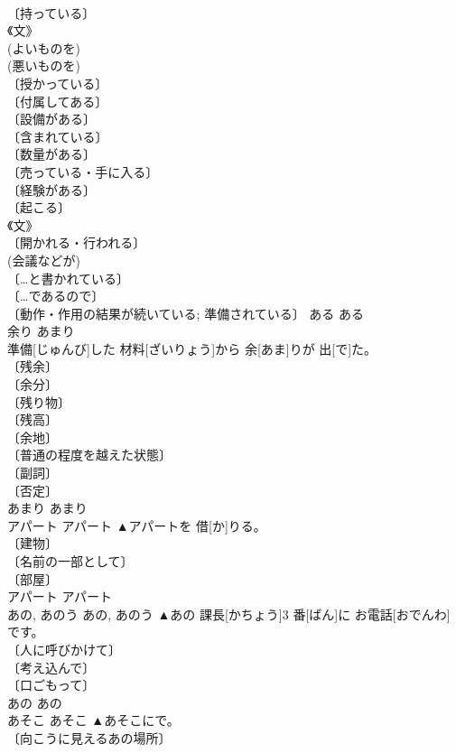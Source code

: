 \documentclass[8pt]{extreport}
\begin{document}
\begin{CJK}{UTF8}{min}
\\	〔持っている〕 
\\	《文》 
\\	(よいものを) 
\\	(悪いものを) 
\\	〔授かっている〕 
\\	〔付属してある〕 
\\	〔設備がある〕 
\\	〔含まれている〕 
\\	〔数量がある〕 
\\	〔売っている・手に入る〕 
\\	〔経験がある〕 
\\	〔起こる〕 
\\	《文》 
\\	〔開かれる・行われる〕 
\\	(会議などが) 
\\	〔…と書かれている〕 
\\	〔…であるので〕 
\\	〔動作・作用の結果が続いている; 準備されている〕	ある	ある	
\\	余り	あまり	
\\	準備[じゅんび]した 材料[ざいりょう]から 余[あま]りが 出[で]た。	
\\	〔残余〕 
\\	〔余分〕 
\\	〔残り物〕 
\\	〔残高〕 
\\	〔余地〕 
\\	〔普通の程度を越えた状態〕 
\\	〔副詞〕 
\\	〔否定〕 
\\	あまり	あまり	
\\	アパート	アパート	▲アパートを 借[か]りる。	
\\	〔建物〕 
\\	〔名前の一部として〕 
\\	〔部屋〕 
\\	アパート	アパート	
\\	あの, あのう	あの, あのう	▲あの 課長[かちょう]3 番[ばん]に お電話[おでんわ]です。	
\\	〔人に呼びかけて〕 
\\	〔考え込んで〕 
\\	〔口ごもって〕 
\\	あの	あの	
\\	あそこ	あそこ	▲あそこに{で}。	
\\	〔向こうに見えるあの場所〕 

\end{CJK}
\end{document}
